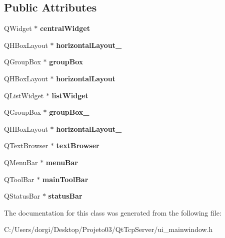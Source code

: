 \subsection*{Public Attributes}
\begin{DoxyCompactItemize}
\item 
\mbox{\label{class_ui___main_window_a30075506c2116c3ed4ff25e07ae75f81}} 
Q\+Widget $\ast$ {\bfseries central\+Widget}
\item 
\mbox{\label{class_ui___main_window_a03ce63974cc69b067c91bbf285cceca8}} 
Q\+H\+Box\+Layout $\ast$ {\bfseries horizontal\+Layout\+\_}
\item 
\mbox{\label{class_ui___main_window_aef7cb3be8cecfc9aaf98f036a98781ce}} 
Q\+Group\+Box $\ast$ {\bfseries group\+Box}
\item 
\mbox{\label{class_ui___main_window_acd6fdc9ebacc4b25b834162380d75ce8}} 
Q\+H\+Box\+Layout $\ast$ {\bfseries horizontal\+Layout}
\item 
\mbox{\label{class_ui___main_window_ae647a15635ba8a0e5d5aec475db99d8f}} 
Q\+List\+Widget $\ast$ {\bfseries list\+Widget}
\item 
\mbox{\label{class_ui___main_window_abb28acde35ffce4d0e6152579df2cbc3}} 
Q\+Group\+Box $\ast$ {\bfseries group\+Box\+\_}
\item 
\mbox{\label{class_ui___main_window_a80867018070156432923d0266cc9fe25}} 
Q\+H\+Box\+Layout $\ast$ {\bfseries horizontal\+Layout\+\_}
\item 
\mbox{\label{class_ui___main_window_a2c789c07fa5fc1cee05aae8df52bb02d}} 
Q\+Text\+Browser $\ast$ {\bfseries text\+Browser}
\item 
\mbox{\label{class_ui___main_window_a2be1c24ec9adfca18e1dcc951931457f}} 
Q\+Menu\+Bar $\ast$ {\bfseries menu\+Bar}
\item 
\mbox{\label{class_ui___main_window_a5172877001c8c7b4e0f6de50421867d1}} 
Q\+Tool\+Bar $\ast$ {\bfseries main\+Tool\+Bar}
\item 
\mbox{\label{class_ui___main_window_a50fa481337604bcc8bf68de18ab16ecd}} 
Q\+Status\+Bar $\ast$ {\bfseries status\+Bar}
\end{DoxyCompactItemize}


The documentation for this class was generated from the following file\+:\begin{DoxyCompactItemize}
\item 
C\+:/\+Users/dorgi/\+Desktop/\+Projeto03/\+Qt\+Tcp\+Server/ui\+\_\+mainwindow.\+h\end{DoxyCompactItemize}
